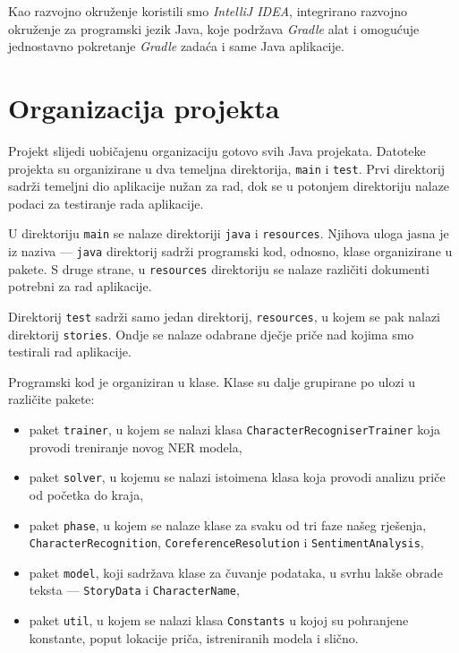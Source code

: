 \documentclass[a4paper,twoside,12pt]{memoir} %
\newcommand{\ti}[1]{\textit{#1\/}}
\begin{document}
		\bigskip

		Kao razvojno okruženje koristili smo \ti{IntelliJ IDEA}, integrirano razvojno okru\-že\-nje za programski jezik Java, koje podržava \ti{Gradle} alat i omogućuje jednostavno pokretanje \ti{Gradle} zadaća i same Java aplikacije.


	\section{Organizacija projekta}

		Projekt slijedi uobičajenu organizaciju gotovo svih Java projekata. Datoteke projekta su organizirane u dva temeljna direktorija, \texttt{main} i \texttt{test}. Prvi direktorij sadrži temeljni dio aplikacije nužan za rad, dok se u potonjem direktoriju nalaze podaci za testiranje rada aplikacije.

		U direktoriju \texttt{main} se nalaze direktoriji \texttt{java} i \texttt{resources}. Njihova uloga jasna je iz naziva --- \texttt{java} direktorij sadrži programski kod, odnosno, klase organizirane u pakete. S druge strane, u \texttt{resources} direktoriju se nalaze različiti dokumenti potrebni za rad aplikacije.

		Direktorij \texttt{test} sadrži samo jedan direktorij, \texttt{resources}, u kojem se pak nalazi direktorij \texttt{stories}. Ondje se nalaze odabrane dječje priče nad kojima smo testirali rad aplikacije.

		\bigskip

		Programski kod je organiziran u klase. Klase su dalje grupirane po ulozi u različite pakete:
		\begin{itemize}
			\item	paket \texttt{trainer}, u kojem se nalazi klasa \texttt{CharacterRecogniserTrainer} koja provodi treniranje novog NER modela,

			\item 	paket \texttt{solver}, u kojemu se nalazi istoimena klasa koja provodi analizu priče od početka do kraja,

			\item 	paket \texttt{phase}, u kojem se nalaze klase za svaku od tri faze našeg rješenja, \texttt{CharacterRecognition}, \texttt{CoreferenceResolution} i \texttt{SentimentAnalysis},

			\item 	paket \texttt{model}, koji sadržava klase za čuvanje podataka, u svrhu lakše obrade teksta --- \texttt{StoryData} i \texttt{CharacterName},

			\item	paket \texttt{util}, u kojem se nalazi klasa \texttt{Constants} u kojoj su pohranjene konstante, poput lokacije priča, istreniranih modela i slično.
		\end{itemize}
\end{document}

